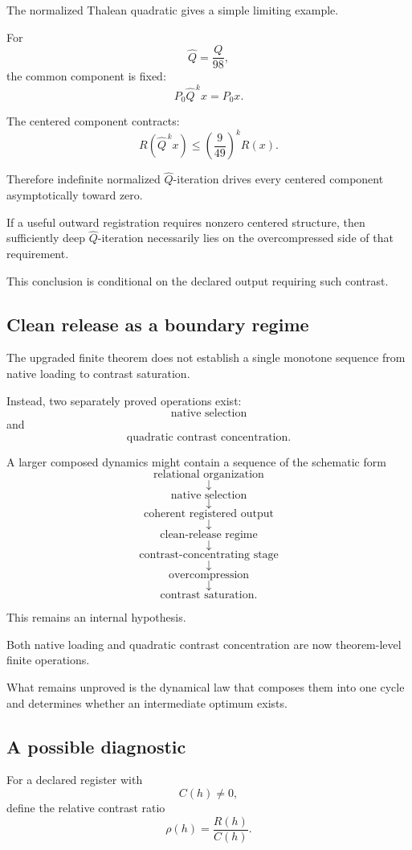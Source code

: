 The normalized Thalean quadratic gives a simple limiting example.

For
\[
\widehat Q=\frac{Q}{98},
\]
the common component is fixed:
\[
P_0\widehat Q^{\,k}x
=
P_0x.
\]

The centered component contracts:
\[
R(\widehat Q^{\,k}x)
\le
\left(\frac{9}{49}\right)^k
R(x).
\]

Therefore indefinite normalized \(\widehat Q\)-iteration drives every
centered component asymptotically toward zero.

If a useful outward registration requires nonzero centered structure,
then sufficiently deep \(\widehat Q\)-iteration necessarily lies on
the overcompressed side of that requirement.

This conclusion is conditional on the declared output requiring such
contrast.

\subsection{Clean release as a boundary regime}


The upgraded finite theorem does not establish a single monotone
sequence from native loading to contrast saturation.

Instead, two separately proved operations exist:
\[
\text{native selection}
\]
and
\[
\text{quadratic contrast concentration}.
\]

A larger composed dynamics might contain a sequence of the schematic
form
\[
\text{relational organization}
\]
\[
\downarrow
\]
\[
\text{native selection}
\]
\[
\downarrow
\]
\[
\text{coherent registered output}
\]
\[
\downarrow
\]
\[
\text{clean-release regime}
\]
\[
\downarrow
\]
\[
\text{contrast-concentrating stage}
\]
\[
\downarrow
\]
\[
\text{overcompression}
\]
\[
\downarrow
\]
\[
\text{contrast saturation}.
\]

This remains an internal hypothesis.

Both native loading and quadratic contrast concentration are now
theorem-level finite operations.

What remains unproved is the dynamical law that composes them into one
cycle and determines whether an intermediate optimum exists.

\subsection{A possible diagnostic}

For a declared register with
\[
C(h)\neq0,
\]
define the relative contrast ratio
\[
\rho(h)
=
\frac{R(h)}{C(h)}.
\]

